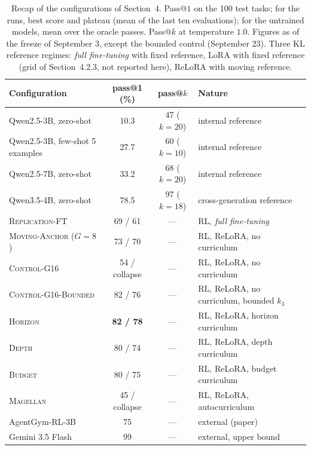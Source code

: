 \documentclass[11pt,a4paper]{article}
\begin{document}
\begin{table}[htbp]
\centering
\caption{Recap of the configurations of Section~4. Pass@$1$ on the 100 test tasks; for the runs, best score and plateau (mean of the last ten evaluations); for the untrained models, mean over the oracle passes. Pass@$k$ at temperature $1.0$. Figures as of the freeze of September 3, except the bounded control (September 23). Three KL reference regimes: \emph{full fine-tuning} with fixed reference, LoRA with fixed reference (grid of Section~4.2.3, not reported here), ReLoRA with moving reference.}
\label{tab:recap_section4}
\small
\begin{tabular}{l c c l}
\toprule
\textbf{Configuration} & \textbf{pass@1 (\%)} & \textbf{pass@$k$} & \textbf{Nature} \\
\midrule
Qwen2.5-3B, zero-shot & 10.3 & 47 ($k{=}20$) & internal reference \\
Qwen2.5-3B, few-shot 5 examples & 27.7 & 60 ($k{=}10$) & internal reference \\
Qwen2.5-7B, zero-shot & 33.2 & 68 ($k{=}20$) & internal reference \\
Qwen3.5-4B, zero-shot & 78.5 & 97 ($k{=}18$) & cross-generation reference \\
\textsc{Replication-FT} & 69 / 61 & --- & RL, \emph{full fine-tuning} \\
\textsc{Moving-Anchor} ($G{=}8$) & 73 / 70 & --- & RL, ReLoRA, no curriculum \\
\textsc{Control-G16} & 54 / collapse & --- & RL, ReLoRA, no curriculum \\
\textsc{Control-G16-Bounded} & 82 / 76 & --- & RL, ReLoRA, no curriculum, bounded $k_3$ \\
\textsc{Horizon} & \textbf{82 / 78} & --- & RL, ReLoRA, horizon curriculum \\
\textsc{Depth} & 80 / 74 & --- & RL, ReLoRA, depth curriculum \\
\textsc{Budget} & 80 / 75 & --- & RL, ReLoRA, budget curriculum \\
\textsc{Magellan} & 45 / collapse & --- & RL, ReLoRA, autocurriculum \\
AgentGym-RL-3B & 75 & --- & external (paper) \\
Gemini 3.5 Flash & 99 & --- & external, upper bound \\
\bottomrule
\end{tabular}
\end{table}
\end{document}

